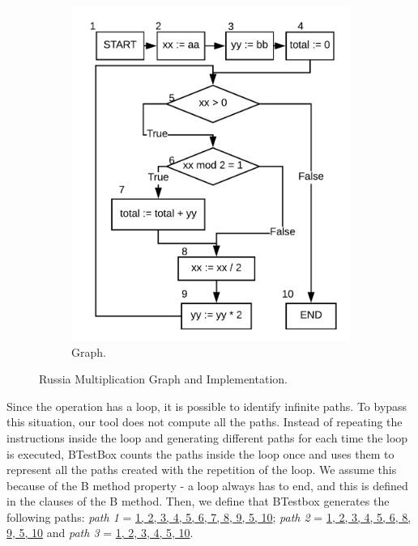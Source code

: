 \documentclass[runningheads]{llncs}
\begin{document}
\begin{figure}
\begin{minipage}{0.45\textwidth}
\begin{subfigure}{\textwidth}
\includegraphics[width = \textwidth]{imagens/lacoGrafo.png}
\caption{Graph.}
\label{fig:russianMultGraph}
\end{subfigure}
\end{minipage}
\caption{Russia Multiplication Graph and Implementation.}
\end{figure}
Since the operation has a loop, it is possible to identify infinite paths. 
To bypass this situation, our tool does not compute all the paths. Instead of repeating the instructions inside the loop and generating different paths for each time the loop is executed, BTestBox counts the paths inside the loop once and uses them to represent all the paths created with the repetition of the loop. 
We assume this because of the B method property - a loop always has to end, and this is defined in the clauses of the B method. Then, we define that BTestbox generates the following paths: \textit{path 1} = \ul{1, 2, 3, 4, 5, 6, 7, 8, 9, 5, 10};  \textit{path 2} = \ul{1, 2, 3, 4, 5, 6, 8, 9, 5, 10} and \textit{path 3} = \ul{1, 2, 3, 4, 5, 10}.
\end{document}
